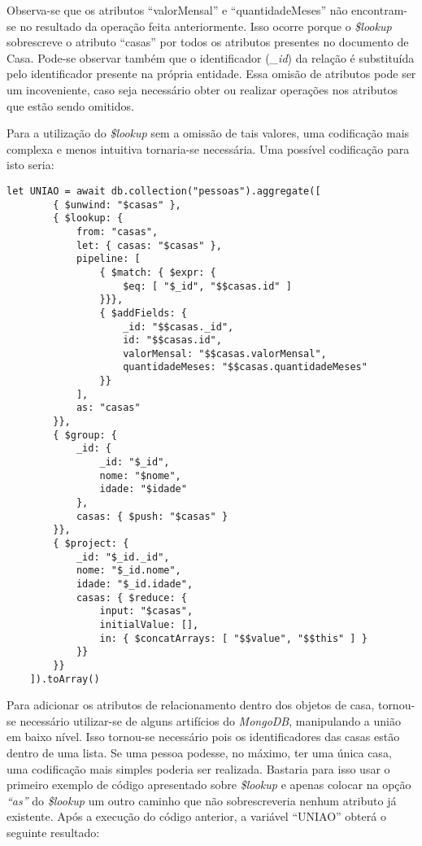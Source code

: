 Observa-se que os atributos ``valorMensal'' e ``quantidadeMeses'' não encontram-se no resultado da operação feita anteriormente. Isso ocorre porque o \textit{\$lookup} sobrescreve o atributo ``casas'' por todos os atributos presentes no documento de Casa. Pode-se observar também que o identificador (\textit{\_id}) da relação é substituída pelo identificador presente na própria entidade. Essa omisão de atributos pode ser um incoveniente, caso seja necessário obter ou realizar operações nos atributos que estão sendo omitidos.

Para a utilização do \textit{\$lookup} sem a omissão de tais valores, uma codificação mais complexa e menos intuitiva tornaria-se necessária. Uma possível codificação para isto seria:

\begin{lstlisting}[style=ES6, caption={Junção de Documentos sem Omissão}]
    let UNIAO = await db.collection("pessoas").aggregate([
        { $unwind: "$casas" },
        { $lookup: {
            from: "casas",
            let: { casas: "$casas" },
            pipeline: [
                { $match: { $expr: {
                    $eq: [ "$_id", "$$casas.id" ]
                }}},
                { $addFields: {
                    _id: "$$casas._id",
                    id: "$$casas.id",
                    valorMensal: "$$casas.valorMensal",
                    quantidadeMeses: "$$casas.quantidadeMeses"
                }}
            ],
            as: "casas"
        }},
        { $group: {
            _id: {
                _id: "$_id",
                nome: "$nome",
                idade: "$idade"
            },
            casas: { $push: "$casas" }
        }},
        { $project: {
            _id: "$_id._id",
            nome: "$_id.nome",
            idade: "$_id.idade",
            casas: { $reduce: {
                input: "$casas",
                initialValue: [],
                in: { $concatArrays: [ "$$value", "$$this" ] }
            }}
        }}
    ]).toArray()
\end{lstlisting}

Para adicionar os atributos de relacionamento dentro dos objetos de casa, tornou-se necessário utilizar-se de alguns artifícios do \textit{MongoDB}, manipulando a união em baixo nível. Isso tornou-se necessário pois os identificadores das casas estão dentro de uma lista. Se uma pessoa podesse, no máximo, ter uma única casa, uma codificação mais simples poderia ser realizada. Bastaria para isso usar o primeiro exemplo de código apresentado sobre \textit{\$lookup} e apenas colocar na opção \textit{``as''} do \textit{\$lookup} um outro caminho que não sobrescreveria nenhum atributo já existente. Após a execução do código anterior, a variável ``UNIAO'' obterá o seguinte resultado:

